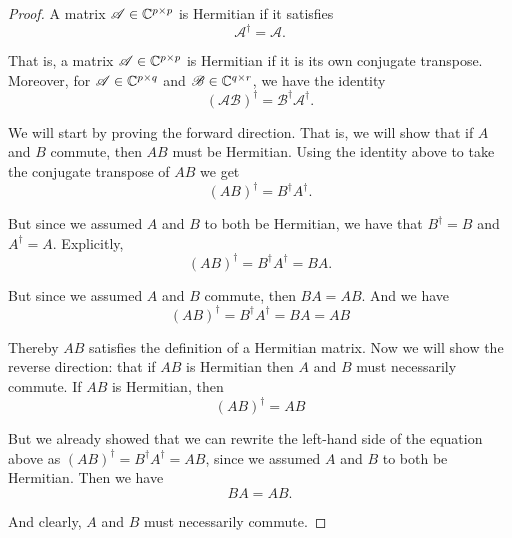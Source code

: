 \documentclass{article}
\numberwithin{equation}{section}
\begin{document}
\begin{proof}

A matrix $\mathscr{A} \in \mathbb{C}^{p \times p}$ is Hermitian if it satisfies
\begin{equation*}
    \mathscr{A}^{\dagger} = \mathscr{A}.
\end{equation*}

That is, a matrix $\mathscr{A} \in \mathbb{C}^{p \times p}$ is Hermitian if it is its own conjugate transpose. Moreover, for $\mathscr{A} \in \mathbb{C}^{p \times q}$ and $\mathscr{B} \in \mathbb{C}^{q \times r}$, we have the identity
\begin{equation*}
    \left( \mathscr{AB} \right)^{\dagger} = \mathscr{B}^{\dagger} \mathscr{A}^{\dagger}.
\end{equation*}

We will start by proving the forward direction. That is, we will show that if $A$ and $B$ commute, then $AB$ must be Hermitian. Using the identity above to take the conjugate transpose of $AB$ we get
\begin{equation*}
    \left( AB \right)^{\dagger} = B^{\dagger} A^{\dagger}.
\end{equation*}

But since we assumed $A$ and $B$ to both be Hermitian, we have that $B^{\dagger} = B$ and $A^{\dagger} = A$. Explicitly,
\begin{equation*}
    \left( AB \right)^{\dagger} = B^{\dagger} A^{\dagger} = BA.
\end{equation*}

But since we assumed $A$ and $B$ commute, then $BA = AB$. And we have
\begin{equation*}
    \left( AB \right)^{\dagger} = B^{\dagger} A^{\dagger} = BA = AB
\end{equation*}

Thereby $AB$ satisfies the definition of a Hermitian matrix. Now we will show the reverse direction: that if $AB$ is Hermitian then $A$ and $B$ must necessarily commute. If $AB$ is Hermitian, then
\begin{equation*}
    \left( AB \right)^{\dagger} = AB
\end{equation*}

But we already showed that we can rewrite the left-hand side of the equation above as $\left( AB \right)^{\dagger} = B^{\dagger} A^{\dagger} = AB$, since we assumed $A$ and $B$ to both be Hermitian. Then we have
\begin{equation*}
    BA = AB.
\end{equation*}

And clearly, $A$ and $B$ must necessarily commute.

\end{proof}
\end{document}
